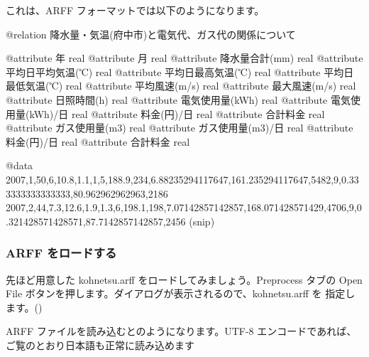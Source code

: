 \documentclass[mingoth,a4paper]{jsarticle}
\begin{document}
これは、ARFF フォーマットでは以下のようになります。

\begin{commandline}
@relation 降水量・気温(府中市)と電気代、ガス代の関係について

@attribute 年 real
@attribute 月 real
@attribute 降水量合計(mm) real
@attribute 平均日平均気温(℃) real
@attribute 平均日最高気温(℃) real
@attribute 平均日最低気温(℃) real
@attribute 平均風速(m/s) real
@attribute 最大風速(m/s) real
@attribute 日照時間(h) real
@attribute 電気使用量(kWh) real
@attribute 電気使用量(kWh)/日 real
@attribute 料金(円)/日 real
@attribute 合計料金 real
@attribute ガス使用量(m3) real
@attribute ガス使用量(m3)/日 real
@attribute 料金(円)/日 real
@attribute 合計料金 real

@data
2007,1,50,6,10.8,1.1,1,5,188.9,234,6.88235294117647,161.235294117647,5482,9,0.333333333333333,80.962962962963,2186
2007,2,44,7.3,12.6,1.9,1.3,6,198.1,198,7.07142857142857,168.071428571429,4706,9,0.321428571428571,87.7142857142857,2456
(snip)
\end{commandline}

\subsubsection{ARFF をロードする}

先ほど用意した kohnetsu.arff をロードしてみましょう。Preprocess タブの
Open File ボタンを押します。ダイアログが表示されるので、kohnetsu.arff を
指定します。()

ARFF ファイルを読み込むとのようになります。UTF-8 エンコードであれば、
ご覧のとおり日本語も正常に読み込めます
\end{document}
